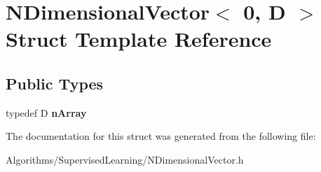\hypertarget{structNDimensionalVector_3_010_00_01D_01_4}{\section{N\-Dimensional\-Vector$<$ 0, D $>$ Struct Template Reference}
\label{structNDimensionalVector_3_010_00_01D_01_4}
}
\subsection*{Public Types}
\begin{DoxyCompactItemize}
\item 
\hypertarget{structNDimensionalVector_3_010_00_01D_01_4_a1eb07b65caa9aad2b7b20b5b8eefd54a}{typedef D {\bfseries n\-Array}}\label{structNDimensionalVector_3_010_00_01D_01_4_a1eb07b65caa9aad2b7b20b5b8eefd54a}

\end{DoxyCompactItemize}


The documentation for this struct was generated from the following file\-:\begin{DoxyCompactItemize}
\item 
Algorithms/\-Supervised\-Learning/N\-Dimensional\-Vector.\-h\end{DoxyCompactItemize}
